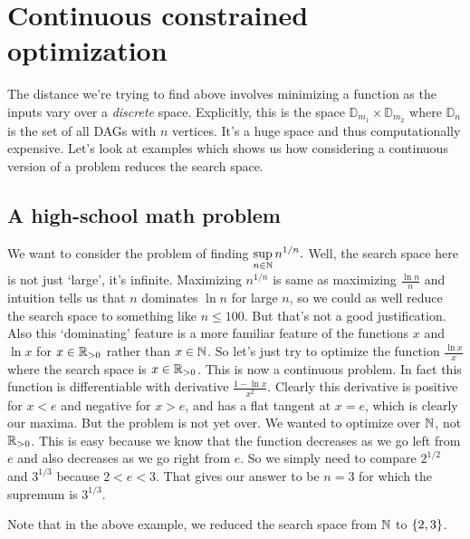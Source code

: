 \section{Continuous constrained optimization}

The distance we're trying to find above involves minimizing a function as the inputs vary over a \textit{discrete} space. Explicitly, this is the space $\mathbb D_{m_1}\times \mathbb D_{m_2}$ where $\mathbb D_n$ is the set of all DAGs with $n$ vertices. It's a huge space and thus computationally expensive. Let's look at examples which shows us how considering a continuous version of a problem reduces the search space.

\subsection{A high-school math problem}

We want to consider the problem of finding $\displaystyle \sup\limits_{n\in\mathbb{N}}n^{1/n}.$ Well, the search space here is not just `large', it's infinite. Maximizing $n^{1/n}$ is same as maximizing $\frac{\ln n}{n}$ and intuition tells us that $n$ dominates $\ln n$ for large $n$, so we could as well reduce the search space to something like $n\leq 100$. But that's not a good justification. Also this `dominating' feature is a more familiar feature of the functions $x$ and $\ln x$ for $x\in \mathbb{R}_{>0}$ rather than $x\in\mathbb{N}$. So let's just try to optimize the function $\frac{\ln x}{x}$ where the search space is $x\in\mathbb{R}_{>0}$. This is now a continuous problem. In fact this function is differentiable with derivative $\frac{1-\ln x}{x^2}$. Clearly this derivative is positive for $x<e$ and negative for $x>e$, and has a flat tangent at $x=e$, which is clearly our maxima. But the problem is not yet over. We wanted to optimize over $\mathbb{N}$, not $\mathbb{R}_{>0}$.  This is easy because we know that the function decreases as we go left from $e$ and also decreases as we go right from $e$. So we simply need to compare $2^{1/2}$ and $3^{1/3}$ because $2<e<3$. That gives our answer to be $n=3$ for which the supremum is $3^{1/3}$.


Note that in the above example, we reduced the search space from $\mathbb{N}$ to $\left\{2,3\right\}$.

